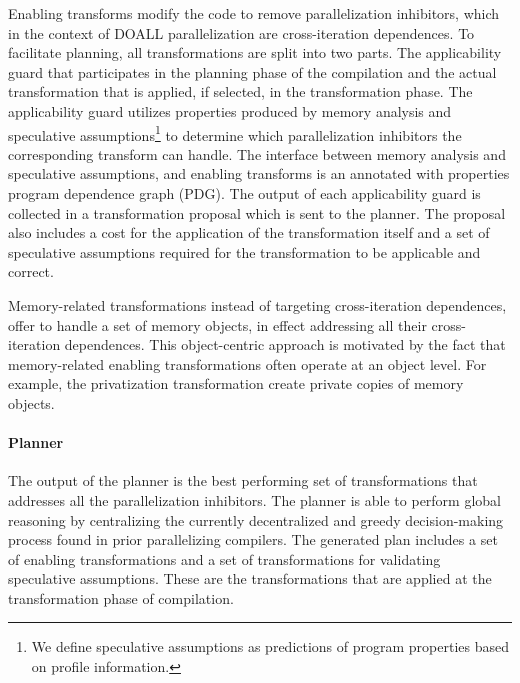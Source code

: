 Enabling transforms modify the code to remove parallelization
inhibitors, which in the context of DOALL parallelization are
cross-iteration dependences.
%
To facilitate planning, all transformations are split into two parts.
The applicability guard that participates in the planning phase of the
compilation and the actual transformation that is applied, if
selected, in the transformation phase.
The applicability guard utilizes properties produced by memory
analysis and speculative assumptions\footnote{We define speculative
assumptions as predictions of program properties based on profile
information.} to determine which parallelization inhibitors the
corresponding transform can handle.
%
The interface between memory analysis and speculative assumptions, and
enabling transforms is an annotated with properties program dependence
graph (PDG).
%
%
The output of each applicability guard is collected in a
transformation proposal which is sent to the planner.
%
%
The proposal also includes a cost for the application of the
transformation itself and a set of speculative assumptions required
for the transformation to be applicable and correct.

Memory-related transformations instead of targeting cross-iteration
dependences, offer to handle a set of memory objects, in effect
addressing all their cross-iteration dependences. This object-centric
approach is motivated by the fact that memory-related enabling
transformations often operate at an object level. For example, the
privatization transformation create private copies of memory objects.

\paragraph{Planner}

%
The output of the planner is the best performing set of
transformations that addresses all the parallelization inhibitors.
%
The planner is able to perform global reasoning by centralizing the
currently decentralized and greedy decision-making process found in
prior parallelizing compilers.
%
The generated plan includes a set of enabling transformations and a
set of transformations for validating speculative assumptions.
%
These are the transformations that are applied at the transformation
phase of compilation.

